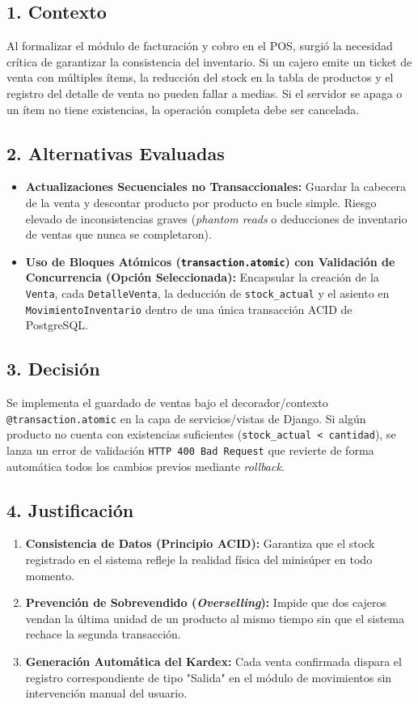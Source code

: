 \documentclass[11pt,a4paper]{article}
\begin{document}
\subsection{1. Contexto}
Al formalizar el módulo de facturación y cobro en el POS, surgió la necesidad crítica de garantizar la consistencia del inventario. Si un cajero emite un ticket de venta con múltiples ítems, la reducción del stock en la tabla de productos y el registro del detalle de venta no pueden fallar a medias. Si el servidor se apaga o un ítem no tiene existencias, la operación completa debe ser cancelada.

\subsection{2. Alternativas Evaluadas}
\begin{itemize}[leftmargin=*]
    \item \textbf{Actualizaciones Secuenciales no Transaccionales:} Guardar la cabecera de la venta y descontar producto por producto en bucle simple. Riesgo elevado de inconsistencias graves (\textit{phantom reads} o deducciones de inventario de ventas que nunca se completaron).
    \item \textbf{Uso de Bloques Atómicos (\texttt{transaction.atomic}) con Validación de Concurrencia (Opción Seleccionada):} Encapsular la creación de la \texttt{Venta}, cada \texttt{DetalleVenta}, la deducción de \texttt{stock\_actual} y el asiento en \texttt{MovimientoInventario} dentro de una única transacción ACID de PostgreSQL.
\end{itemize}

\subsection{3. Decisión}
Se implementa el guardado de ventas bajo el decorador/contexto \texttt{@transaction.atomic} en la capa de servicios/vistas de Django. Si algún producto no cuenta con existencias suficientes (\texttt{stock\_actual < cantidad}), se lanza un error de validación \texttt{HTTP 400 Bad Request} que revierte de forma automática todos los cambios previos mediante \textit{rollback}.

\subsection{4. Justificación}
\begin{enumerate}
    \item \textbf{Consistencia de Datos (Principio ACID):} Garantiza que el stock registrado en el sistema refleje la realidad física del minisúper en todo momento.
    \item \textbf{Prevención de Sobrevendido (\textit{Overselling}):} Impide que dos cajeros vendan la última unidad de un producto al mismo tiempo sin que el sistema rechace la segunda transacción.
    \item \textbf{Generación Automática del Kardex:} Cada venta confirmada dispara el registro correspondiente de tipo "Salida" en el módulo de movimientos sin intervención manual del usuario.
\end{enumerate}
\end{document}
